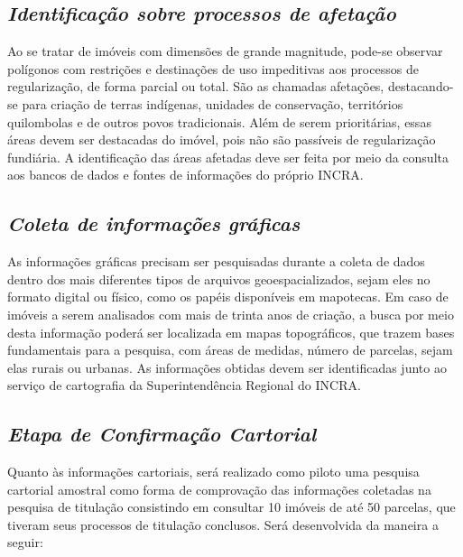 \documentclass[
  letterpaper,
]{report}
\begin{document}
\hypertarget{identificauxe7uxe3o-sobre-processos-de-afetauxe7uxe3o}{%
\subsection{\texorpdfstring{\emph{Identificação sobre processos de
afetação}}{Identificação sobre processos de afetação}}\label{identificauxe7uxe3o-sobre-processos-de-afetauxe7uxe3o}}

Ao se tratar de imóveis com dimensões de grande magnitude, pode-se
observar polígonos com restrições e destinações de uso impeditivas aos
processos de regularização, de forma parcial ou total. São as chamadas
afetações, destacando-se para criação de terras indígenas, unidades de
conservação, territórios quilombolas e de outros povos tradicionais.
Além de serem prioritárias, essas áreas devem ser destacadas do imóvel,
pois não são passíveis de regularização fundiária. A identificação das
áreas afetadas deve ser feita por meio da consulta aos bancos de dados e
fontes de informações do próprio INCRA.

\hypertarget{coleta-de-informauxe7uxf5es-gruxe1ficas}{%
\subsection{\texorpdfstring{\emph{Coleta de informações
gráficas}}{Coleta de informações gráficas}}\label{coleta-de-informauxe7uxf5es-gruxe1ficas}}

As informações gráficas precisam ser pesquisadas durante a coleta de
dados dentro dos mais diferentes tipos de arquivos geoespacializados,
sejam eles no formato digital ou físico, como os papéis disponíveis em
mapotecas. Em caso de imóveis a serem analisados com mais de trinta anos
de criação, a busca por meio desta informação poderá ser localizada em
mapas topográficos, que trazem bases fundamentais para a pesquisa, com
áreas de medidas, número de parcelas, sejam elas rurais ou urbanas. As
informações obtidas devem ser identificadas junto ao serviço de
cartografia da Superintendência Regional do INCRA.

\hypertarget{etapa-de-confirmauxe7uxe3o-cartorial}{%
\subsection{\texorpdfstring{\emph{Etapa de Confirmação
Cartorial}}{Etapa de Confirmação Cartorial}}\label{etapa-de-confirmauxe7uxe3o-cartorial}}

Quanto às informações cartoriais, será realizado como piloto uma
pesquisa cartorial amostral como forma de comprovação das informações
coletadas na pesquisa de titulação consistindo em consultar 10 imóveis
de até 50 parcelas, que tiveram seus processos de titulação conclusos.
Será desenvolvida da maneira a seguir:
\end{document}
